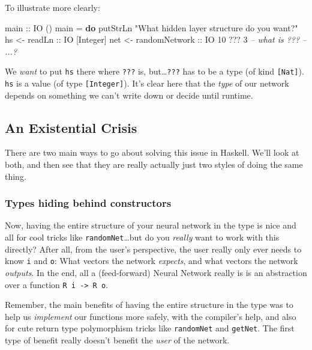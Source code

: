 \documentclass[]{article}
\newenvironment{Shaded}{}{}
\newcommand{\KeywordTok}[1]{\textcolor[rgb]{0.00,0.44,0.13}{\textbf{{#1}}}}
\newcommand{\DataTypeTok}[1]{\textcolor[rgb]{0.56,0.13,0.00}{{#1}}}
\newcommand{\DecValTok}[1]{\textcolor[rgb]{0.25,0.63,0.44}{{#1}}}
\newcommand{\StringTok}[1]{\textcolor[rgb]{0.25,0.44,0.63}{{#1}}}
\newcommand{\CommentTok}[1]{\textcolor[rgb]{0.38,0.63,0.69}{\textit{{#1}}}}
\newcommand{\OtherTok}[1]{\textcolor[rgb]{0.00,0.44,0.13}{{#1}}}
\newcommand{\FunctionTok}[1]{\textcolor[rgb]{0.02,0.16,0.49}{{#1}}}
\newcommand{\NormalTok}[1]{{#1}}
\begin{document}
To illustrate more clearly:

\begin{Shaded}
\begin{Highlighting}[]
\OtherTok{main ::} \DataTypeTok{IO} \NormalTok{()}
\NormalTok{main }\FunctionTok{=} \KeywordTok{do}
    \NormalTok{putStrLn }\StringTok{"What hidden layer structure do you want?"}
    \NormalTok{hs  }\OtherTok{<- readLn        ::} \DataTypeTok{IO} \NormalTok{[}\DataTypeTok{Integer}\NormalTok{]}
    \NormalTok{net }\OtherTok{<- randomNetwork ::} \DataTypeTok{IO} \DecValTok{10} \FunctionTok{???} \DecValTok{3}   \CommentTok{-- what is ???}
    \CommentTok{-- ...?}
\end{Highlighting}
\end{Shaded}

We \emph{want} to put \texttt{hs} there where \texttt{???} is,
but\ldots{}\texttt{???} has to be a type (of kind \texttt{{[}Nat{]}}).
\texttt{hs} is a value (of type \texttt{{[}Integer{]}}). It's clear here that
the \emph{type} of our network depends on something we can't write down or
decide until runtime.

\subsection{An Existential Crisis}\label{an-existential-crisis}

There are two main ways to go about solving this issue in Haskell. We'll look at
both, and then see that they are really actually just two styles of doing the
same thing.

\subsubsection{Types hiding behind
constructors}\label{types-hiding-behind-constructors}

Now, having the entire structure of your neural network in the type is nice and
all for cool tricks like \texttt{randomNet}\ldots{}but do you \emph{really} want
to work with this directly? After all, from the user's perspective, the user
really only ever needs to know \texttt{i} and \texttt{o}: What vectors the
network \emph{expects}, and what vectors the network \emph{outputs}. In the end,
all a (feed-forward) Neural Network really is is an abstraction over a function
\texttt{R\ i\ -\textgreater{}\ R\ o}.

Remember, the main benefits of having the entire structure in the type was to
help us \emph{implement} our functions more safely, with the compiler's help,
and also for cute return type polymorphism tricks like \texttt{randomNet} and
\texttt{getNet}. The first type of benefit really doesn't benefit the
\emph{user} of the network.
\end{document}
